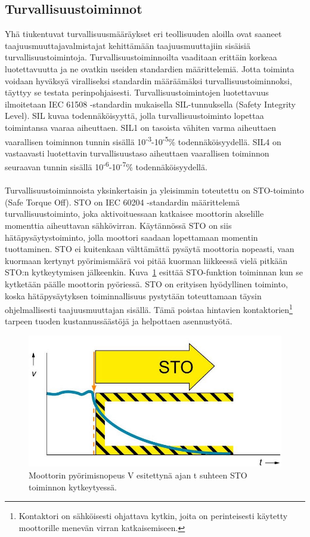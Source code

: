 \documentclass[finnish,12pt,a4paper,pdftex,elec,utf8]{aaltothesis}
\begin{document}
\subsection{Turvallisuustoiminnot}
Yhä tiukentuvat turvallisuusmääräykset eri teollisuuden aloilla ovat saaneet taajuusmuuttajavalmistajat kehittämään taajuusmuuttajiin sisäisiä turvallisuustoimintoja. Turvallisuustoiminnoilta vaaditaan erittäin korkeaa luotettavuutta ja ne ovatkin useiden standardien määrittelemiä. Jotta toiminta voidaan hyväksyä viralliseksi standardin määräämäksi turvallisuustoiminnoksi, täyttyy se testata perinpohjaisesti. Turvallisuustoimintojen luotettavuus ilmoitetaan IEC 61508 -standardin \cite{IEC61508} mukaisella SIL-tunnuksella (Safety Integrity Level). SIL kuvaa todennäköisyyttä, jolla turvallisuustoiminto lopettaa toimintansa vaaraa aiheuttaen. SIL1 on tasoista vähiten varma aiheuttaen vaarallisen toiminnon tunnin sisällä 10\textsuperscript{-3}-10\textsuperscript{-5}\% todennäköisyydellä. SIL4 on vastaavasti luotettavin turvallisuustaso aiheuttaen vaarallisen toiminnon seuraavan tunnin sisällä 10\textsuperscript{-6}-10\textsuperscript{-7}\% todennäköisyydellä.
\\\\
Turvallisuustoiminnoista yksinkertaisin ja yleisimmin toteutettu on STO-toiminto (Safe Torque Off). STO on IEC 60204 -standardin \cite{IEC60204-1} määrittelemä turvallisuustoiminto, joka aktivoituessaan katkaisee moottorin akselille momenttia aiheuttavan sähkövirran. Käytännössä STO on siis hätäpysäytystoiminto, jolla moottori saadaan lopettamaan momentin tuottaminen. STO ei kuitenkaan välttämättä pysäytä moottoria nopeasti, vaan kuormaan kertynyt pyörimismäärä voi pitää kuorman liikkeessä vielä pitkään STO:n kytkeytymisen jälkeenkin. Kuva~\ref{fig:STO} esittää STO-funktion toiminnan kun se kytketään päälle moottorin pyöriessä. STO on erityisen hyödyllinen toiminto, koska hätäpysäytyksen toiminnallisuus pystytään toteuttamaan täysin ohjelmallisesti taajuusmuuttajan sisällä. Tämä poistaa hintavien kontaktorien\footnote{Kontaktori on sähköisesti ohjattava kytkin, joita on perinteisesti käytetty moottorille menevän virran katkaisemiseen.} tarpeen tuoden kustannussäästöjä ja helpottaen asennustyötä.
\begin{figure}[H]
	\begin{center}
	\includegraphics[scale=0.5]{STO}
	\end{center}
	\caption{Moottorin pyörimisnopeus V esitettynä ajan t suhteen STO toiminnon kytkeytyessä.
		 \cite{STOkuva}}
	\label{fig:STO}
\end{figure}
\end{document}
